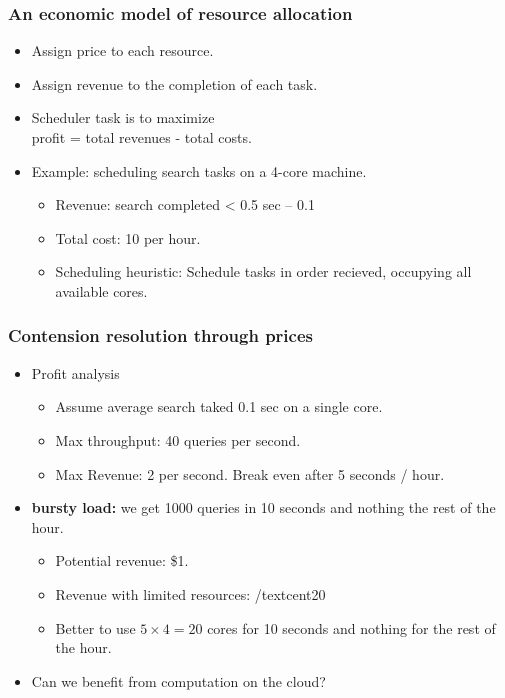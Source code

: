 \documentclass{beamer}
\newcommand{\blue}[1]{{\color{blue} #1}}
\begin{document}
\begin{frame}
\frametitle{An economic model of resource allocation}
\begin{itemize}
\item Assign price to each resource.
\item Assign revenue to the completion of each task.
\item Scheduler task is to maximize \\
{\color{blue} profit = total revenues - total costs.}
\item Example: scheduling search tasks on a 4-core machine.
\begin{itemize}
\item \blue{Revenue:} search completed < 0.5 sec -- {\textcent}0.1
\item \blue{Total cost:}  {\textcent}10 per hour.
\item \blue{Scheduling heuristic}: Schedule tasks in order
  recieved, occupying all available cores.
\end{itemize}
\end{itemize}
\end{frame}

\begin{frame}
\frametitle{Contension resolution through prices}
\begin{itemize}
\item Profit analysis
\begin{itemize}
\item Assume average search taked 0.1 sec on a single core.
\item Max throughput: 40 queries per second.
\item Max Revenue: {\textcent}2 per second. Break even after 5 seconds / hour. 
\end{itemize}
\item {\bf bursty load:} we get 1000 queries in 10 seconds and nothing
  the rest of the hour.
\begin{itemize}
\item Potential revenue: \$1.
\item Revenue with limited resources: {/textcent}20
\item Better to use $5 \times 4=20$ cores for 10 seconds and nothing
  for the rest of the hour.
\end{itemize}
\item Can we benefit from computation on the cloud?
\end{itemize}
\end{frame}
\end{document}
